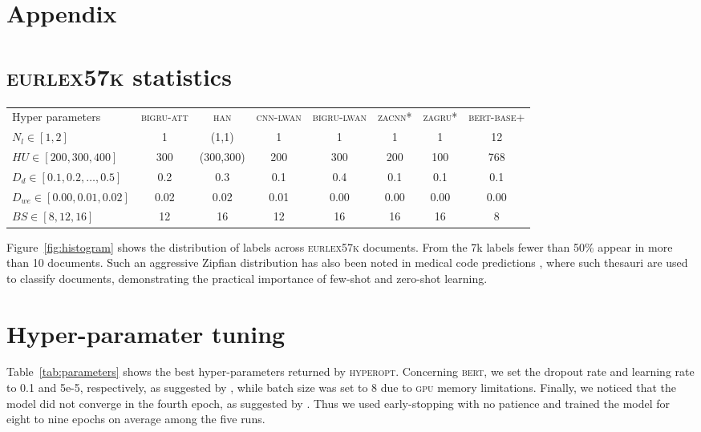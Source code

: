 \documentclass[11pt,a4paper]{article}
\newcommand{\bigruatt}{\textsc{bigru-att}\xspace}
\newcommand{\han}{\textsc{han}\xspace}
\newcommand{\zacnn}{\textsc{zacnn}\xspace}
\newcommand{\zagru}{\textsc{zagru}\xspace}
\newcommand{\lwancnn}{\textsc{cnn-lwan}\xspace}
\newcommand{\lwangru}{\textsc{bigru-lwan}\xspace}
\newcommand{\bert}{\textsc{bert}\xspace}
\newcommand{\bertbase}{\textsc{bert-base}\xspace}
\newcommand{\newdata}{\textsc{eurlex57k}\xspace}
\newcommand{\gpu}{\textsc{gpu}\xspace}
\begin{document}
\appendix
\section*{Appendix}

\section{\newdata statistics}
\label{app:dataset}

\begin{table*}[h]
\centering
{
\small
\begin{tabular}{lccccccc}
  \hline
  Hyper parameters & \bigruatt & \han & \lwancnn & \lwangru & \zacnn* & \zagru* & \bertbase+ \\
  $N_l\in[1, 2]$ & 1 & (1,1) & 1 & 1 & 1 & 1 & 12 \\
  $HU\in[200, 300, 400]$ & 300 & (300,300) & 200 & 300 & 200 & 100 & 768 \\
  $D_d\in[0.1, 0.2, \dots, 0.5]$ & 0.2 & 0.3 & 0.1 & 0.4 & 0.1 & 0.1 & 0.1 \\
  $D_{we}\in[0.00, 0.01, 0.02]$ & 0.02 & 0.02 & 0.01 & 0.00 & 0.00 & 0.00 & 0.00 \\
  $BS\in[8, 12, 16]$ & 12 & 16 & 12 & 16 & 16 & 16 & 8 \\
  \hline
 \end{tabular}
 }
  \caption{Best hyper parameters for neural methods. $N_l$: number of layers, $HU$: hidden units size, $D_d$: dropout rate across dimensions, $D_{we}$: dropout rate of word embeddings, $BS$: batch size. * Hidden units size is fixed to word embedding dimensionality, + $N_l$, $HU$ are fixed from the pre-trained model. Dropout rate fixed as suggested by Devlin et al. (2018).}
\label{tab:parameters}
\end{table*}

Figure~\ref{fig:histogram} shows the distribution of labels across \newdata documents. From the 7k labels fewer than 50\% appear in more than 10 documents. Such an aggressive Zipfian distribution has also been noted in medical code predictions \cite{Rios2018-2}, where such thesauri are used to classify documents, demonstrating the practical importance of few-shot and zero-shot learning. 

\section{Hyper-paramater tuning}
\label{app:hyperopt}
Table~\ref{tab:parameters} shows the best hyper-parameters returned by \textsc{hyperopt}. Concerning \bert, we set the dropout rate and learning rate to 0.1 and 5e-5, respectively, as suggested by \citet{bert}, while batch size was set to 8 due to \gpu memory limitations. Finally, we noticed that the model did not converge in the fourth epoch, as suggested by \citet{bert}. Thus we used early-stopping with no patience and trained the model for eight to nine epochs on average among the five runs. 
\end{document}
